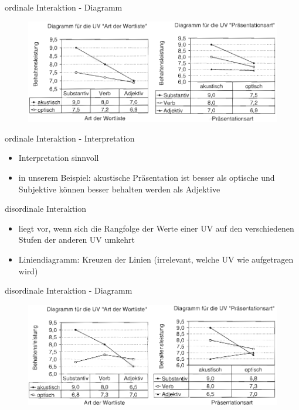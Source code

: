 \documentclass{beamer}
\begin{document}
	\begin{frame}{ordinale Interaktion - Diagramm}
		\begin{figure}
			\centering
			\includegraphics[width=1.0\textwidth]{Bilder/ordinaleI.png}
		\end{figure}
	\end{frame}
	
	\begin{frame}{ordinale Interaktion - Interpretation}
		\begin{itemize}
			\item Interpretation sinnvoll
			\item in unserem Beispiel: akustische Präsentation ist besser als optische und Subjektive können besser behalten werden als Adjektive
		\end{itemize}
	\end{frame}
	
	\begin{frame}{disordinale Interaktion}
		\begin{itemize}
			\item liegt vor, wenn sich die Rangfolge der Werte einer UV auf den verschiedenen Stufen der anderen UV umkehrt
			\item Liniendiagramm: Kreuzen der Linien (irrelevant, welche UV wie aufgetragen wird)
		\end{itemize}
	\end{frame}
	
	\begin{frame}{disordinale Interaktion - Diagramm}
		\begin{figure}
			\centering
			\includegraphics[width=1.0\textwidth]{Bilder/disordinaleI.png}
		\end{figure}
	\end{frame}
	
\end{document}
